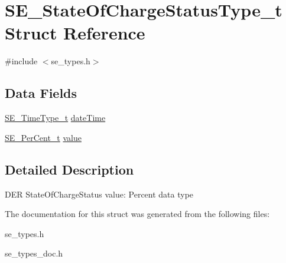 \hypertarget{structSE__StateOfChargeStatusType__t}{}\section{S\+E\+\_\+\+State\+Of\+Charge\+Status\+Type\+\_\+t Struct Reference}
\label{structSE__StateOfChargeStatusType__t}


{\ttfamily \#include $<$se\+\_\+types.\+h$>$}

\subsection*{Data Fields}
\begin{DoxyCompactItemize}
\item 
\hyperlink{group__TimeType_ga6fba87a5b57829b4ff3f0e7638156682}{S\+E\+\_\+\+Time\+Type\+\_\+t} \hyperlink{group__StateOfChargeStatusType_gabbb370a0df0f72f770564a96dad0e5b4}{date\+Time}
\item 
\hyperlink{group__PerCent_ga14278cbee754c63496035b722b417ddc}{S\+E\+\_\+\+Per\+Cent\+\_\+t} \hyperlink{group__StateOfChargeStatusType_ga7eb72659a38d7f837b71a6ff4997083e}{value}
\end{DoxyCompactItemize}


\subsection{Detailed Description}
D\+ER State\+Of\+Charge\+Status value\+: Percent data type 

The documentation for this struct was generated from the following files\+:\begin{DoxyCompactItemize}
\item 
se\+\_\+types.\+h\item 
se\+\_\+types\+\_\+doc.\+h\end{DoxyCompactItemize}
